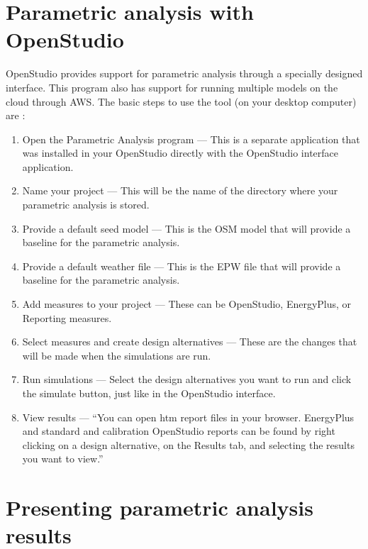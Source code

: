 \documentclass[10pt]{article}
\begin{document}
\section{Parametric analysis with OpenStudio}

OpenStudio provides support for parametric analysis through a specially designed interface. This program also has support for running multiple models on the cloud through AWS. The basic steps to use the tool (on your desktop computer) are \cite{noauthor_undated-yz}:

\begin{enumerate}
    \setlength{\itemsep}{0pt}%
    \setlength{\parskip}{0pt}%
    \item Open the Parametric Analysis program --- This is a separate application that was installed in your OpenStudio directly with the OpenStudio interface application.
    \item Name your project --- This will be the name of the directory where your parametric analysis is stored.
    \item Provide a default seed model --- This is the OSM model that will provide a baseline for the parametric analysis.
    \item Provide a default weather file --- This is the EPW file that will provide a baseline for the parametric analysis.
    \item Add measures to your project --- These can be OpenStudio, EnergyPlus, or Reporting measures.
    \item Select measures and create design alternatives --- These are the changes that will be made when the simulations are run.
    \item Run simulations --- Select the design alternatives you want to run and click the simulate button, just like in the OpenStudio interface.
    \item View results --- ``You can open htm report files
in your browser. EnergyPlus and
standard and calibration OpenStudio reports can be found by right
clicking on a design alternative, on
the Results tab, and selecting the
results you want to view.'' \cite{noauthor_undated-ks}
\end{enumerate}

\section{Presenting parametric analysis results}
\end{document}
